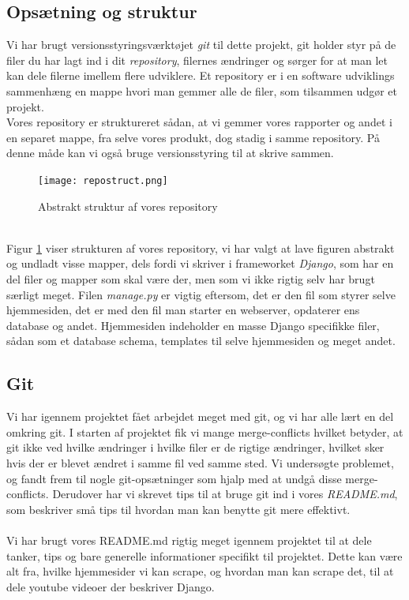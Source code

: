 \documentclass[12pt]{article}
\begin{document}
\subsection{Opsætning og struktur}
Vi har brugt versionsstyringsværktøjet \textit{git} til dette projekt, git holder styr på de filer du har lagt ind i dit \textit{repository}, filernes ændringer og sørger for at man let kan dele filerne imellem flere udviklere. Et repository er i en software udviklings sammenhæng en mappe hvori man gemmer alle de filer, som tilsammen udgør et projekt. \\
Vores repository er struktureret sådan, at vi gemmer vores rapporter og andet i en separet mappe, fra selve vores produkt, dog stadig i samme repository. På denne måde kan vi også bruge versionsstyring til at skrive sammen.

\begin{figure}[H]
	\centering
	\texttt{[image: repostruct.png]}
	 \caption{Abstrakt struktur af vores repository}
	 \label{fig:repostruct}
\end{figure}
~\\
Figur \ref{fig:repostruct} viser strukturen af vores repository, vi har valgt at lave figuren abstrakt og undladt visse mapper, dels fordi vi skriver i frameworket \textit{Django}, som har en del filer og mapper som skal være der, men som vi ikke rigtig selv har brugt særligt meget. Filen \textit{manage.py} er vigtig eftersom, det er den fil som styrer selve hjemmesiden, det er med den fil man starter en webserver, opdaterer ens database og andet. Hjemmesiden indeholder en masse Django specifikke filer, sådan som et database schema, templates til selve hjemmesiden og meget andet.

\subsection{Git}
\label{subsec:Git}
Vi har igennem projektet fået arbejdet meget med git, og vi har alle lært en del omkring git. I starten af projektet fik vi mange merge-conflicts hvilket betyder, at git ikke ved hvilke ændringer i hvilke filer er de rigtige ændringer, hvilket sker hvis der er blevet ændret i samme fil ved samme sted. Vi undersøgte problemet, og fandt frem til nogle git-opsætninger som hjalp med at undgå disse merge-conflicts. Derudover har vi skrevet tips til at bruge git ind i vores \textit{README.md}, som beskriver små tips til hvordan man kan benytte git mere effektivt. \\ \\
Vi har brugt vores README.md rigtig meget igennem projektet til at dele tanker, tips og bare generelle informationer specifikt til projektet. Dette kan være alt fra, hvilke hjemmesider vi kan scrape, og hvordan man kan scrape det, til at dele youtube videoer der beskriver Django.
\end{document}
